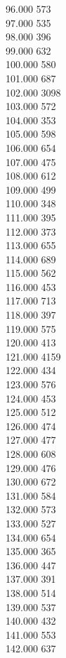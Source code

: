 { 96.000	573 \\
 97.000	535 \\
 98.000	396 \\
 99.000	632 \\
 100.000	580 \\
 101.000	687 \\
 102.000	3098 \\
 103.000	572 \\
 104.000	353 \\
 105.000	598 \\
 106.000	654 \\
 107.000	475 \\
 108.000	612 \\
 109.000	499 \\
 110.000	348 \\
 111.000	395 \\
 112.000	373 \\
 113.000	655 \\
 114.000	689 \\
 115.000	562 \\
 116.000	453 \\
 117.000	713 \\
 118.000	397 \\
 119.000	575 \\
 120.000	413 \\
 121.000	4159 \\
 122.000	434 \\
 123.000	576 \\
 124.000	453 \\
 125.000	512 \\
 126.000	474 \\
 127.000	477 \\
 128.000	608 \\
 129.000	476 \\
 130.000	672 \\
 131.000	584 \\
 132.000	573 \\
 133.000	527 \\
 134.000	654 \\
 135.000	365 \\
 136.000	447 \\
 137.000	391 \\
 138.000	514 \\
 139.000	537 \\
 140.000	432 \\
 141.000	553 \\
 142.000	637 \\
}

